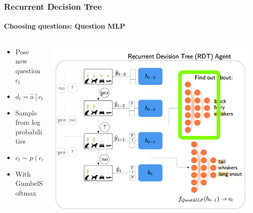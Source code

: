 \documentclass[9pt]{beamer}
\begin{document}
\begin{frame}
\frametitle{Recurrent Decision Tree}
\framesubtitle{Choosing questions: Question MLP}
\begin{columns}[T]
\begin{column}{.5\textwidth}
\begin{itemize}
	\item Pose new question $c_t$
	\item $d_t = \hat{a}\left[c_t\right]$
	\item Sample from log probabilities
	\item $c_t \sim p(c_t)$
	\item With GumbelSoftmax
\end{itemize}
\end{column}
\begin{column}{.5\textwidth}
\includegraphics[width=\textwidth]{images/urdtc_parts_questMLP.pdf}
\end{column}
\end{columns}
\end{frame}
\end{document}
